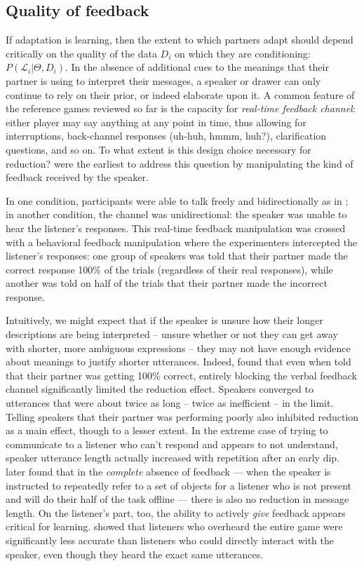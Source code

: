 \subsection{Quality of feedback}

If adaptation is learning, then the extent to which partners adapt should depend critically on the quality of the data $D_i$ on which they are conditioning: $P(\mathcal{L}_i | \Theta, D_i)$. In the absence of additional cues to the meanings that their partner is using to interpret their messages, a speaker or drawer can only continue to rely on their prior, or indeed elaborate upon it. A common feature of the reference games reviewed so far is the capacity for \emph{real-time feedback channel}: either player may say anything at any point in time, thus allowing for interruptions, back-channel responses (uh-huh, hmmm, huh?), clarification questions, and so on. To what extent is this design choice necessary for reduction?  were the earliest to address this question by manipulating the kind of feedback received by the speaker.

In one condition, participants were able to talk freely and bidirectionally as in ; in another condition, the channel was unidirectional: the speaker was unable to hear the listener's responses. This real-time feedback manipulation was crossed with a behavioral feedback manipulation where the experimenters intercepted the listener's responses: one group of speakers was told that their partner made the correct response 100\% of the trials (regardless of their real responses), while another was told on half of the trials that their partner made the incorrect response. 

Intuitively, we might expect that if the speaker is unsure how their longer descriptions are being interpreted -- unsure whether or not they can get away with shorter, more ambiguous expressions -- they may not have enough evidence about meanings to justify shorter utterances. Indeed,  found that even when told that their partner was getting 100\% correct, entirely blocking the verbal feedback channel significantly limited the reduction effect. Speakers converged to utterances that were about twice as long -- twice as inefficient -- in the limit. Telling speakers that their partner was performing poorly also inhibited reduction as a main effect, though to a lesser extent. In the extreme case of trying to communicate to a listener who can't respond and appears to not understand, speaker utterance length actually increased with repetition after an early dip.  later found that in the \emph{complete} absence of feedback --- when the speaker is instructed to repeatedly refer to a set of objects for a listener who is not present and will do their half of the task offline --- there is also no reduction in message length. On the listener's part, too, the ability to actively \emph{give} feedback appears critical for learning.  showed that listeners who overheard the entire game were significantly less accurate than listeners who could directly interact with the speaker, even though they heard the exact same utterances.

